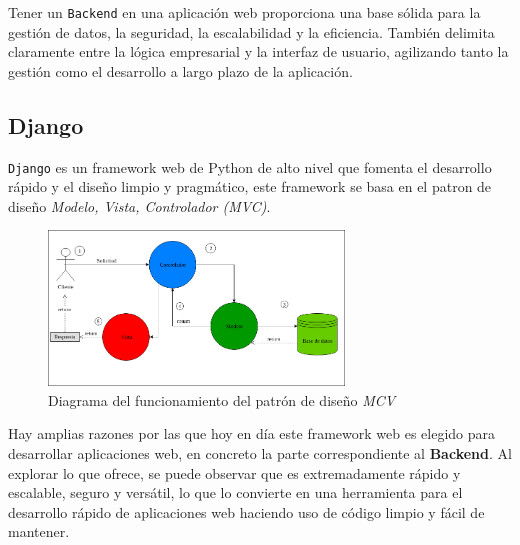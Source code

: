 Tener un \texttt{Backend} en una aplicación  web proporciona una base sólida para la gestión de datos, la seguridad, la escalabilidad y la eficiencia. También delimita claramente entre la lógica empresarial y la interfaz de usuario, agilizando tanto la gestión como el desarrollo a largo plazo de la aplicación.

\subsection{Django}
\texttt{Django} es un framework web de Python de alto nivel que fomenta el desarrollo rápido y el diseño limpio y pragmático, este framework se basa en el patron de diseño \textit{Modelo, Vista, Controlador (MVC)}.\\

    \begin{figure}[H]
        \centering
        \includegraphics[width=0.7\textwidth]{images/MVC.png}
        \caption{Diagrama del funcionamiento del patrón de diseño \textit{MCV}}
    \end{figure}


Hay amplias razones por las que hoy en día este framework web es elegido para desarrollar aplicaciones web, en concreto la parte correspondiente al \textbf{Backend}. Al explorar lo que ofrece, se puede observar que es extremadamente rápido y escalable, seguro y versátil, lo que lo convierte en una herramienta para el desarrollo rápido de aplicaciones web haciendo uso de código limpio y fácil de mantener.\\

